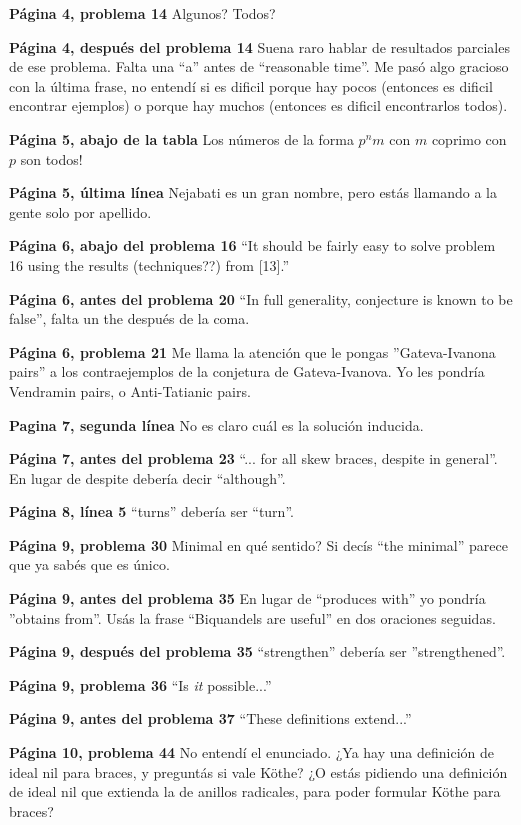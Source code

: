 \documentclass[11pt,fleqn]{article}
\begin{document}
\textbf{Página 4, problema 14} Algunos? Todos?

\textbf{Página 4, después del problema 14} Suena raro hablar de resultados 
parciales de ese problema. Falta una ``a'' antes de ``reasonable time''. Me pasó 
algo gracioso con la última frase, no entendí si es dificil porque hay pocos 
(entonces es dificil encontrar ejemplos) o porque hay muchos (entonces es 
dificil encontrarlos todos).

\textbf{Página 5, abajo de la tabla} Los números de la forma $p^n m$ con $m$ 
coprimo con $p$ son todos!

\textbf{Página 5, última línea} Nejabati es un gran nombre, pero estás 
llamando a la gente solo por apellido.

\textbf{Página 6, abajo del problema 16} ``It should be fairly easy to solve 
problem 16 using the results (techniques??) from [13].''

\textbf{Página 6, antes del problema 20} ``In full generality, conjecture is 
known to be false'', falta un the después de la coma.

\textbf{Página 6, problema 21} Me llama la atención que le pongas
''Gateva-Ivanona pairs'' a los contraejemplos de la conjetura de 
Gateva-Ivanova. Yo les pondría Vendramin pairs, o Anti-Tatianic pairs.

\textbf{Pagina 7, segunda línea} No es claro cuál es la solución inducida.

\textbf{Página 7, antes del problema 23} ``... for all skew braces, despite in 
general''. En lugar de despite debería decir ``although''.

\textbf{Página 8, línea 5} ``turns'' debería ser ``turn''.

\textbf{Página 9, problema 30} Minimal en qué sentido? Si decís ``the minimal''
parece que ya sabés que es único.

\textbf{Página 9, antes del problema 35} En lugar de ``produces with'' yo pondría
''obtains from''. Usás la frase ``Biquandels are useful'' en dos oraciones 
seguidas.

\textbf{Página 9, después del problema 35} ``strengthen'' debería ser 
''strengthened''.

\textbf{Página 9, problema 36} ``Is \emph{it} possible...''

\textbf{Página 9, antes del problema 37} ``These definitions extend...''

\textbf{Página 10, problema 44} No entendí el enunciado. ¿Ya hay una 
definición de ideal nil para braces, y preguntás si vale Köthe? ¿O estás 
pidiendo una definición de ideal nil que extienda la de anillos radicales,
para poder formular Köthe para braces?
\end{document}
